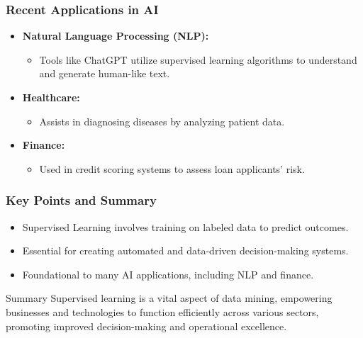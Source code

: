 \documentclass[aspectratio=169]{beamer}
\begin{document}
\begin{frame}[fragile]
  \frametitle{Recent Applications in AI}
  \begin{itemize}
    \item \textbf{Natural Language Processing (NLP):}
      \begin{itemize}
        \item Tools like ChatGPT utilize supervised learning algorithms to understand and generate human-like text.
      \end{itemize}

    \item \textbf{Healthcare:}
      \begin{itemize}
        \item Assists in diagnosing diseases by analyzing patient data.
      \end{itemize}

    \item \textbf{Finance:}
      \begin{itemize}
        \item Used in credit scoring systems to assess loan applicants' risk.
      \end{itemize}
  \end{itemize}
\end{frame}

\begin{frame}[fragile]
  \frametitle{Key Points and Summary}
  \begin{itemize}
    \item Supervised Learning involves training on labeled data to predict outcomes.
    \item Essential for creating automated and data-driven decision-making systems.
    \item Foundational to many AI applications, including NLP and finance.
  \end{itemize}

  \begin{block}{Summary}
    Supervised learning is a vital aspect of data mining, empowering businesses and technologies to function efficiently across various sectors, promoting improved decision-making and operational excellence.
  \end{block}
\end{frame}
\end{document}
